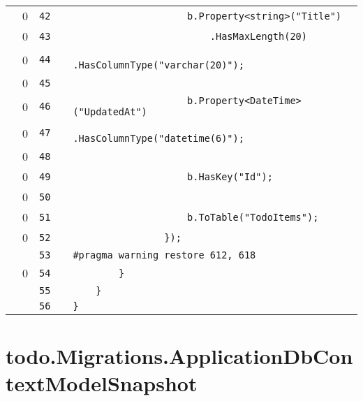 \documentclass[a4paper,landscape,10pt]{article}
\begin{document}
\begin{longtable}[l]{lrrll}
\cellcolor{red} & 0 & \verb~42~ & & \verb~                    b.Property<string>("Title")~\\
\cellcolor{red} & 0 & \verb~43~ & & \verb~                        .HasMaxLength(20)~\\
\cellcolor{red} & 0 & \verb~44~ & & \verb~                        .HasColumnType("varchar(20)");~\\
\cellcolor{red} & 0 & \verb~45~ & & \verb~~\\
\cellcolor{red} & 0 & \verb~46~ & & \verb~                    b.Property<DateTime>("UpdatedAt")~\\
\cellcolor{red} & 0 & \verb~47~ & & \verb~                        .HasColumnType("datetime(6)");~\\
\cellcolor{red} & 0 & \verb~48~ & & \verb~~\\
\cellcolor{red} & 0 & \verb~49~ & & \verb~                    b.HasKey("Id");~\\
\cellcolor{red} & 0 & \verb~50~ & & \verb~~\\
\cellcolor{red} & 0 & \verb~51~ & & \verb~                    b.ToTable("TodoItems");~\\
\cellcolor{red} & 0 & \verb~52~ & & \verb~                });~\\
\cellcolor{gray} &  & \verb~53~ & & \verb~#pragma warning restore 612, 618~\\
\cellcolor{red} & 0 & \verb~54~ & & \verb~        }~\\
\cellcolor{gray} &  & \verb~55~ & & \verb~    }~\\
\cellcolor{gray} &  & \verb~56~ & & \verb~}~\\
\end{longtable}
\newpage
\section{todo.Migrations.ApplicationDbContextModelSnapshot}
\end{document}

